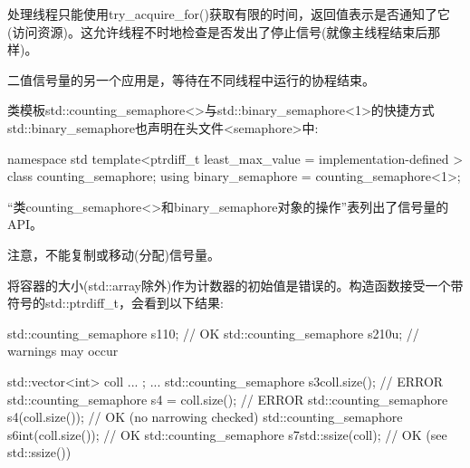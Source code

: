 处理线程只能使用try\_acquire\_for()获取有限的时间，返回值表示是否通知了它(访问资源)。这允许线程不时地检查是否发出了停止信号(就像主线程结束后那样)。

二值信号量的另一个应用是，等待在不同线程中运行的协程结束。


类模板std::counting\_semaphore<>与std::binary\_semaphore<1>的快捷方式std::binary\_semaphore也声明在头文件<semaphore>中:

\begin{cpp}
namespace std {
	template<ptrdiff_t least_max_value = implementation-defined >
	class counting_semaphore;
	using binary_semaphore = counting_semaphore<1>;
}
\end{cpp}

“类counting\_semaphore<>和binary\_semaphore对象的操作”表列出了信号量的API。

注意，不能复制或移动(分配)信号量。

将容器的大小(std::array除外)作为计数器的初始值是错误的。构造函数接受一个带符号的std::ptrdiff\_t，会看到以下结果:

\begin{cpp}
std::counting_semaphore s1{10}; // OK
std::counting_semaphore s2{10u}; // warnings may occur

std::vector<int> coll{ ... };
...
std::counting_semaphore s3{coll.size()}; // ERROR
std::counting_semaphore s4 = coll.size(); // ERROR
std::counting_semaphore s4(coll.size()); // OK (no narrowing checked)
std::counting_semaphore s6{int(coll.size())}; // OK
std::counting_semaphore s7{std::ssize(coll)}; // OK (see std::ssize())
\end{cpp}

